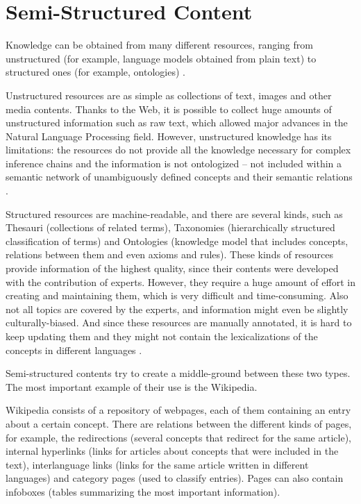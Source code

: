 \section{Semi-Structured Content}
Knowledge can be obtained from many different resources, ranging from unstructured (for example, language models obtained from plain text) to structured ones (for example, ontologies) \cite{hovy2013collaboratively}.

Unstructured resources are as simple as collections of text, images and other media contents. Thanks to the Web, it is possible to collect huge amounts of unstructured information such as raw text, which allowed major advances in the Natural Language Processing field. However, unstructured knowledge has its limitations: the resources do not provide all the knowledge necessary for complex inference chains \cite{domingos2007toward} and the information is not ontologized – not included within a semantic network of unambiguously defined concepts and their semantic relations \cite{hovy2013collaboratively}.

Structured resources are machine-readable, and there are several kinds, such as Thesauri (collections of related terms), Taxonomies (hierarchically structured classification of terms) and Ontologies (knowledge model that includes concepts, relations between them and even axioms and rules). These kinds of resources provide information of the highest quality, since their contents were developed with the contribution of experts. However, they require a huge amount of effort in creating and maintaining them, which is very difficult and time-consuming. Also not all topics are covered by the experts, and information might even be slightly culturally-biased. And since these resources are manually annotated, it is hard to keep updating them and they might not contain the lexicalizations of the concepts in different languages \cite{hovy2013collaboratively}.

Semi-structured contents try to create a middle-ground between these two types. The most important example of their use is the Wikipedia. 

Wikipedia consists of a repository of webpages, each of them containing an entry about a certain concept. There are relations between the different kinds of pages, for example, the redirections (several concepts that redirect for the same article), internal hyperlinks (links for articles about concepts that were included in the text), interlanguage links (links for the same article written in different languages) and category pages (used to classify entries). Pages can also contain infoboxes (tables summarizing the most important information).

